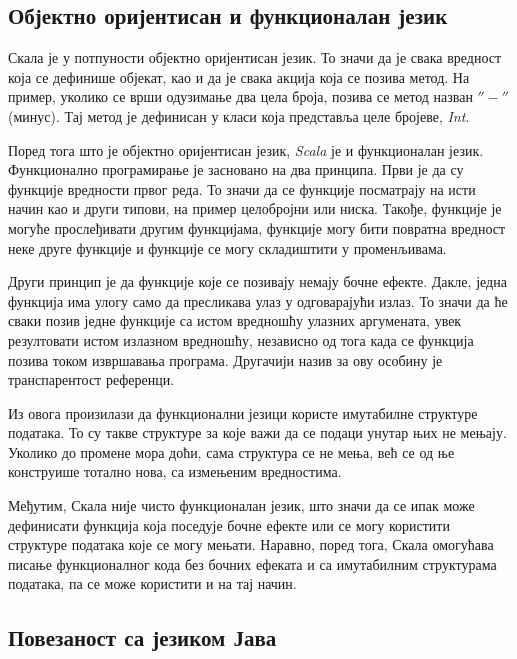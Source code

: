 \documentclass[12pt,oneside]{memoir}
\begin{document}
\subsection{Објектно оријентисан и функционалан језик}
\label{subsec:scala_obj_prog}

Скала је у потпуности објектно оријентисан језик. То значи да је свака вредност која се дефинише објекат, као и да је свака акција која се позива метод. На пример, уколико се врши одузимање два цела броја, позива се метод назван $''-''$ (минус). Тај метод је дефинисан у класи која представља целе бројеве, \textit{Int}. \cite{scala_prog}

Поред тога што је објектно оријентисан језик, \textit{Scala} је и функционалан језик. Функционално програмирање је засновано на два принципа. Први је да су функције вредности првог реда. То значи да се функције посматрају на исти начин као и други типови, на пример целобројни или ниска. Такође, функције је могуће прослеђивати другим функцијама, функције могу бити повратна вредност неке друге функције и функције се могу складиштити у променљивама.

Други принцип је да функције које се позивају немају бочне ефекте. Дакле, једна функција има улогу само да пресликава улаз у одговарајући излаз. То значи да ће сваки позив једне функције са истом вредношћу улазних аргумената, увек резултовати истом излазном вредношћу, независно од тога када се функција позива током извршавања програма. Другачији назив за ову особину је транспарентост референци. \cite{scala_prog}

Из овога произилази да функционални језици користе имутабилне структуре података. То су такве структуре за које важи да се подаци унутар њих не мењају. Уколико до промене мора доћи, сама структура се не мења, већ се од ње конструише тотално нова, са измењеним вредностима. \cite{scala_prog}

Међутим, Скала није чисто функционалан језик, што значи да се ипак може дефинисати функција која поседује бочне ефекте или се могу користити структуре података које се могу мењати. Наравно, поред тога, Скала омогућава писање функционалног кода без бочних ефеката и са имутабилним структурама података, па се може користити и на тај начин. \cite{scala_prog}

\subsection{Повезаност са језиком Јава}
\label{subsec:scala_komp}
\end{document}
